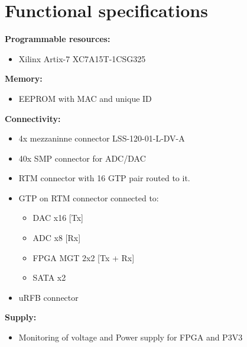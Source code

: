 %	
%
	

\section{Functional specifications}

\noindent

\textbf{Programmable resources:}

\begin{itemize}
\item Xilinx Artix-7 XC7A15T-1CSG325

\end{itemize}	

\textbf{Memory:}

\begin{itemize}

	\item EEPROM with MAC and unique ID 
	
\end{itemize}

\textbf{Connectivity:}

\begin{itemize}
	\item 4x mezzaninne connector LSS-120-01-L-DV-A 
	\item 40x SMP connector for ADC/DAC
	\item RTM connector with 16 GTP pair routed to it.
	\item GTP on RTM connector connected to:
	\begin{itemize}
		\item DAC x16 [Tx]
		\item ADC x8 [Rx]
		\item FPGA MGT 2x2 [Tx + Rx]
		\item SATA x2 
	\end{itemize}
	\item uRFB connector
	
\end{itemize}

\textbf{Supply:}

\begin{itemize}
	\item Monitoring of voltage and Power supply for FPGA and P3V3
	
\end{itemize}


